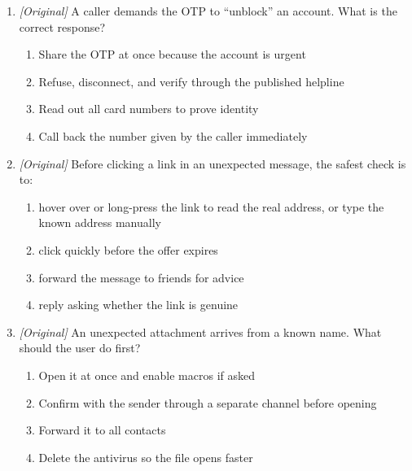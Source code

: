 \begin{enumerate}[label=\textbf{Q\arabic*.}, leftmargin=*]
  trusted sender are called \underline{\hspace{1.6cm}}.
  Fraudulent voice calls of the same kind are called
  \underline{\hspace{1.6cm}}.
  \begin{enumerate}[label=\Alph*.]
    \item smishing; vishing
    \item caching; compiling
    \item backing up; indexing
    \item surfing; browsing
  \end{enumerate}
\item \textit{[Original]} A caller demands the OTP to ``unblock'' an
  account. What is the correct response?
  \begin{enumerate}[label=\Alph*.]
    \item Share the OTP at once because the account is urgent
    \item Refuse, disconnect, and verify through the published helpline
    \item Read out all card numbers to prove identity
    \item Call back the number given by the caller immediately
  \end{enumerate}
\item \textit{[Original]} Before clicking a link in an unexpected message,
  the safest check is to:
  \begin{enumerate}[label=\Alph*.]
    \item hover over or long-press the link to read the real address, or type the known address manually
    \item click quickly before the offer expires
    \item forward the message to friends for advice
    \item reply asking whether the link is genuine
  \end{enumerate}
\item \textit{[Original]} An unexpected attachment arrives from a known
  name. What should the user do first?
  \begin{enumerate}[label=\Alph*.]
    \item Open it at once and enable macros if asked
    \item Confirm with the sender through a separate channel before opening
    \item Forward it to all contacts
    \item Delete the antivirus so the file opens faster

\end{enumerate}
\end{enumerate}
